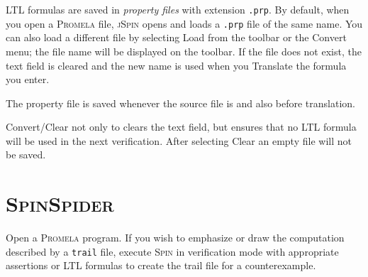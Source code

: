 \documentclass[11pt]{article}
\newcommand{\spn}{\textsc{Spin}}
\newcommand{\prm}{\textsc{Promela}}
\newcommand{\js}{\textsc{jSpin}}
\newcommand{\spd}{\textsc{SpinSpider}}
\newcommand{\p}[1]{\texttt{#1}}
\newcommand{\bu}[1]{\textsf{#1}}
\begin{document}
LTL formulas are saved in \emph{property files} with extension \p{.prp}.
By default, when you open a \prm{} file,
\js{} opens and loads a \p{.prp} file of the same name.
You can also load a different file by selecting \bu{Load} from
the toolbar or the \bu{Convert} menu;
the file name will be displayed on the toolbar.
If the file does not exist,
the text field is cleared and the new name is used when you \bu{Translate} the formula
you enter.

The property file is saved whenever the source file is
and also before translation.

\bu{Convert/Clear} not only to clears the text field, but ensures that
no LTL formula will be used in the next verification.
After selecting \bu{Clear} an empty file will not be saved.

\section{\spd{}}
Open a \prm{} program. If you wish to emphasize or draw the computation
described by a \p{trail} file, execute \spn{} in verification mode with
appropriate assertions or LTL formulas to create the trail file for a counterexample.
\end{document}
